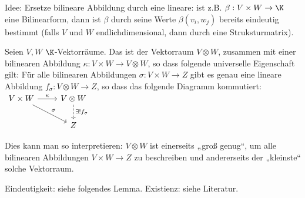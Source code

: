 

Idee: Ersetze bilineare Abbildung durch eine lineare: ist z.B. $\beta: V \times W \to \K$ eine Bilinearform, dann ist $\beta$ durch seine Werte $\beta(v_i, w_j)$ bereits eindeutig bestimmt (falls $V$ und $W$ endlichdimensional, dann durch eine Struksturmatrix).

\begin{df} \label{5.10}
    Seien $V, W$ $\K$-Vektorräume.
    Das  ist der Vektorraum $V \otimes W$, zusammen mit einer bilinearen Abbildung $\kappa: V \times W \to V \otimes W$, so dass folgende universelle Eigenschaft gilt:
    Für alle bilinearen Abbildungen $\sigma: V \times W \to Z$ gibt es genau eine lineare Abbildung $f_\sigma: V \otimes W \to Z$, so dass das folgende Diagramm kommutiert:
    \begin{math}
        \begin{tikzcd}
            V \times W \ar[r,"\kappa"] \ar[rd,"\sigma"] & V \otimes W \ar[d,"\exists! f_\sigma",dashed] \\
            & Z
        \end{tikzcd}
    \end{math}
    \begin{note}
        Dies kann man so interpretieren: $V \otimes W$ ist einerseits „groß genug“, um alle bilinearen Abbildungen $V \times W \to Z$ zu beschreiben und andererseits der „kleinste“ solche Vektorraum.

        Eindeutigkeit: siehe folgendes Lemma.
        Existienz: siehe Literatur.
    \end{note}
\end{df}

